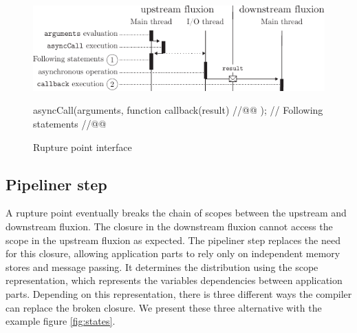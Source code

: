 
\begin{figure}[h!]
\begin{center}
  \includegraphics[width=\linewidth]{ressources/basicrp.pdf}
  \begin{code}
asyncCall(arguments, function callback(result){ //@@ });
// Following statements //@@
  \end{code}
  \caption{Rupture point interface}
  \label{fig:basicrp}
\end{center}
\end{figure}




\subsection{Pipeliner step} \label{section:compiler:pipeliner}

A rupture point eventually breaks the chain of scopes between the upstream and downstream fluxion.
The closure in the downstream fluxion cannot access the scope in the upstream fluxion as expected.
The pipeliner step replaces the need for this closure, allowing application parts to rely only on independent memory stores and message passing.
It determines the distribution using the scope representation, which represents the variables dependencies between application parts.
Depending on this representation, there is three different ways the compiler can replace the broken closure.
We present these three alternative with the example figure \ref{fig:states}.

